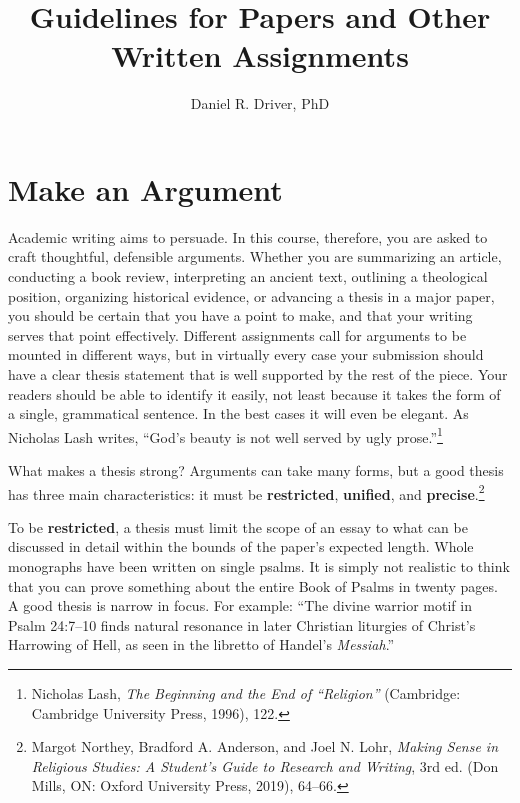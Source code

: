 \documentclass[11pt]{article}
\title{Guidelines for Papers and Other Written Assignments}
\author{Daniel R. Driver, PhD}
\date{}
\begin{document}
\maketitle


\section{Make an Argument}

Academic writing aims to persuade. In this course, therefore, you are
asked to craft thoughtful, defensible arguments. Whether you are
summarizing an article, conducting a book review, interpreting an
ancient text, outlining a theological position, organizing historical
evidence, or advancing a thesis in a major paper, you should be certain
that you have a point to make, and that your writing serves that point
effectively. Different assignments call for arguments to be mounted in
different ways, but in virtually every case your submission should have
a clear thesis statement that is well supported by the rest of the
piece. Your readers should be able to identify it easily, not least
because it takes the form of a single, grammatical sentence. In the best
cases it will even be elegant. As Nicholas Lash writes, “God’s beauty is
not well served by ugly prose.”\footnote{Nicholas Lash, \emph{The
Beginning and the End of “Religion”} (Cambridge: Cambridge University
Press, 1996), 122.}

What makes a thesis strong? Arguments can take many forms, but a good
thesis has three main characteristics: it must be \textbf{restricted},
\textbf{unified}, and \textbf{precise}.\footnote{Margot Northey,
Bradford A. Anderson, and Joel N. Lohr, \emph{Making Sense in Religious
Studies: A Student's Guide to Research and Writing}, 3rd ed. (Don Mills,
ON: Oxford University Press, 2019), 64–66.}

To be \textbf{restricted}, a thesis must limit the scope of an essay to
what can be discussed in detail within the bounds of the paper's
expected length. Whole monographs have been written on single psalms. It
is simply not realistic to think that you can prove something about the
entire Book of Psalms in twenty pages. A good thesis is narrow in focus.
For example: “The divine warrior motif in Psalm 24:7–10 finds natural
resonance in later Christian liturgies of Christ's Harrowing of Hell, as
seen in the libretto of Handel's \emph{Messiah}.”
\end{document}
